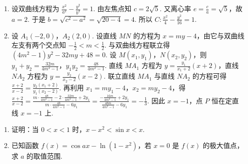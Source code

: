 \begin{solution}
\begin{enumerate}
\item 设双曲线方程为 \(\frac{x^2}{a^2}-\frac{y^2}{b^2}=1\).
由左焦点知 \(c=2\sqrt5\). 又离心率 \(e=\frac{c}{a}=\sqrt5\)，故 \(a=2\). 于是 \(b=\sqrt{c^2-a^2}=\sqrt{20-4}=4\). 所以 \(C:\frac{x^2}{4}-\frac{y^2}{16}=1\).

\item 设 \(A_1(-2,0)\)，\(A_2(2,0)\). 设直线 \(MN\) 的方程为 \(x=my-4\)，由它与双曲线左支有两个交点知 \(-\frac12<m<\frac12\). 与双曲线方程联立得 \((4m^2-1)y^2-32my+48=0\). 设 \(M(x_1,y_1)\)，\(N(x_2,y_2)\)，则 \(y_1+y_2=\frac{32m}{4m^2-1}\)，\(y_1y_2=\frac{48}{4m^2-1}\).
直线 \(MA_1\) 方程为 \(y=\frac{y_1}{x_1+2}(x+2)\)，直线 \(NA_2\) 方程为 \(y=\frac{y_2}{x_2-2}(x-2)\).
联立直线 \(MA_1\) 与直线 \(NA_2\) 的方程可得 \(\frac{x+2}{x-2}=\frac{y_2(x_1+2)}{y_1(x_2-2)}\).
再利用 \(x_1=my_1-4\)，\(x_2=my_2-4\)，得 \(\frac{x+2}{x-2}=\frac{m\cdot \frac{48}{4m^2-1}-2\cdot \frac{32m}{4m^2-1}+2y_1}{m\cdot \frac{48}{4m^2-1}-6y_1}=\frac{-\frac{16m}{4m^2-1}+2y_1}{\frac{48m}{4m^2-1}-6y_1}=-\frac13\).
因此 \(x=-1\)，点 \(P\) 恒在定直线 \(x=-1\) 上.

\end{enumerate}
\end{solution}

\begin{problem}
\begin{enumerate}
    \item 证明：当 \(0<x<1\) 时，\(x-x^2<\sin x<x\).
    \item 已知函数 \(f(x)=\cos ax-\ln(1-x^2)\)，若 \(x=0\) 是 \(f(x)\) 的极大值点，求 \(a\) 的取值范围.
\end{enumerate}
\end{problem}

